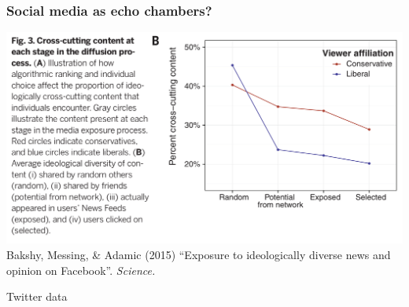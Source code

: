 \documentclass{beamer}
\begin{document}
\begin{frame}
	\frametitle{Social media as echo chambers?}
	
	\hspace{-.75cm}\includegraphics[width=.9\paperwidth]{figures/messing-science.png}\\
	
	\vspace{.10cm}
	\small{Bakshy, Messing, \& Adamic (2015) ``Exposure to ideologically diverse news and opinion on Facebook''. \textit{Science.}}
\end{frame}

\begin{frame}
	
	\centering\Huge{Twitter data}
	
\end{frame}
\end{document}
